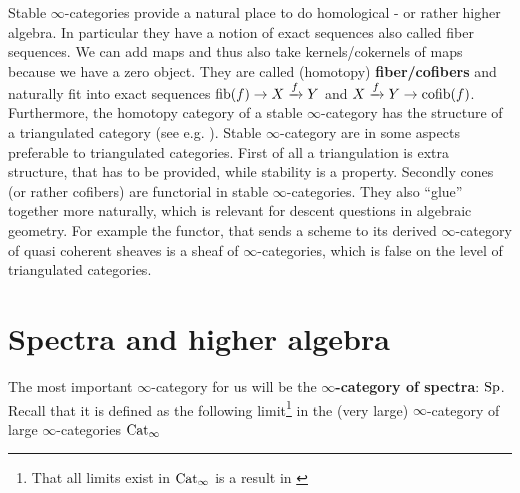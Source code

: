 \begin{itemize}
    Stable $\infty$-categories provide a natural place to do homological - or rather higher algebra. In particular they have a notion of exact sequences also called fiber sequences. We can add maps and thus also take kernels/cokernels of maps because we have a zero object. 
    They are called (homotopy) \textbf{fiber/cofibers} and naturally fit into exact sequences $\operatorname{fib}(f)\rightarrow X\xrightarrow{f} Y$ and $X\xrightarrow{f} Y\rightarrow \operatorname{cofib}(f)$. Furthermore, the homotopy category of a stable $\infty$-category has the structure of a triangulated category (see e.g. \cite[Theorem~1.1.2.14]{lurie2017higher}). Stable $\infty$-category are in some aspects preferable to triangulated categories.
    First of all a triangulation is extra structure, that has to be provided, while stability is a property. Secondly cones (or rather cofibers) are functorial in stable $\infty$-categories. 
    They also ``glue'' together more naturally, which is relevant for descent questions in algebraic geometry. For example the functor, that sends a scheme to its derived $\infty$-category of quasi coherent sheaves is a sheaf of $\infty$-categories, which is false on the level of triangulated categories.
    
\end{itemize}
\section{Spectra and higher algebra}\label{higheralg}
The most important $\infty$-category for us will be the\textbf{ $\infty$-category of spectra}: $\operatorname{Sp}$. Recall that it is defined as the following limit\footnote{That all limits exist in $\operatorname{Cat}_\infty$ is a result in \cite[Section~3.3.3]{HigherToposTheory}} in the (very large) $\infty$-category of large $\infty$-categories $\operatorname{Cat}_\infty$

